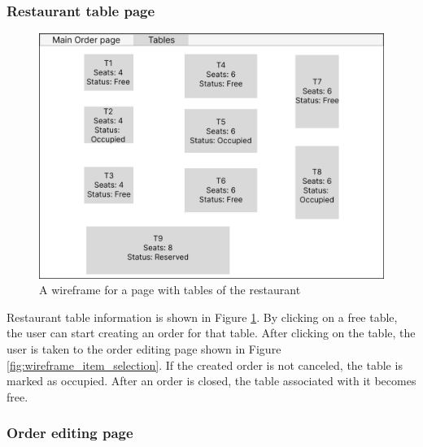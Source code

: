 \documentclass[11pt,a4paper,pdftex]{article}
\begin{document}
\subsubsection{Restaurant table page}

\begin{figure}[H]
    \centering
    \includegraphics[width=1\linewidth]{wireframes/TablePage.png}
    \caption{A wireframe for a page with tables of the restaurant}
    \label{fig:wireframe_table_page}
\end{figure}

Restaurant table information is shown in Figure \ref{fig:wireframe_table_page}. By clicking on a free table, the user can start creating an order for that table. After clicking on the table, the user is taken to the order editing page shown in Figure \ref{fig:wireframe_item_selection}. If the created order is not canceled, the table is marked as occupied. After an order is closed, the table associated with it becomes free.

\subsubsection{Order editing page}
\end{document}
